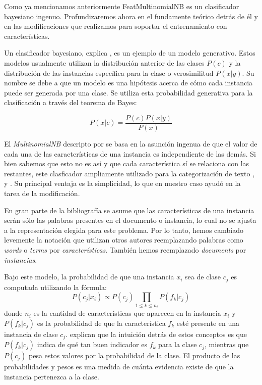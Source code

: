 Como ya mencionamos anteriormente FeatMultinomialNB es un clasificador bayesiano ingenuo. Profundizaremos ahora en el fundamente teórico detrás de él y en las modificaciones que realizamos para soportar el entrenamiento con características.

Un clasificador bayesiano, explica \citet{libro-abney}, es un ejemplo de un modelo generativo. Estos modelos usualmente utilizan la distribución anterior de las clases $P(c)$ y la distribución de las instancias específica para la clase o verosimilitud $P(x|y)$. Su nombre se debe a que un modelo es una hipótesis acerca de cómo cada instancia puede ser generada por una clase. Se utiliza esta probabilidad generativa para la clasificación a través del teorema de Bayes:

$$P(x|c) = \frac{P(c)P(x|y)}{P(x)}$$

El \textit{MultinomialNB} descripto por \citet{multinomial-manning} se basa en la asunción ingenua de que el valor de cada una de las características de una instancia es independiente de las demás. Si bien sabemos que esto no es así y que cada característica sí se relaciona con las restantes, este clasficador ampliamente utilizado para la categorización de texto \citet{dualist}, \citet{multinomialnb-comparision-mccallum} y \citet{multinomialnb-unbalanced}. Su principal ventaja es la simplicidad, lo que en nuestro caso ayudó en la tarea de la modificación.

En gran parte de la bibliografía se asume que las características de una instancia serán sólo las palabras presentes en el documento o instancia, lo cual no se ajusta a la representación elegida para este problema. Por lo tanto, hemos cambiado levemente la notación que utilizan otros autores reemplazando palabras como \textit{words} o \textit{terms} por \textit{características}. También hemos reemplazado \textit{documents} por \textit{instancias}.

Bajo este modelo, la probabilidad de que una instancia $x_i$ sea de clase $c_j$ es computada utilizando la fórmula:
\begin{equation}\label{eq-mnb-prob}
    P(c_j|x_i) \propto P(c_j) \prod_{1\leq k \leq n_i}P(f_k|c_j)
\end{equation}
donde $n_i$ es la cantidad de características que aparecen en la instancia $x_i$ y $P(f_k|c_j)$ es la probabilidad de que la característica $f_k$ esté presente en una instancia de clase $c_j$. \citet{multinomial-manning} explican que la intuición detrás de estos conceptos es que $P(f_k|c_j)$ indica de qué tan buen indicador es $f_k$ para la clase $c_j$, mientras que $P(c_j)$ pesa estos valores por la probabilidad de la clase. El producto de las probabilidades y pesos es una medida de cuánta evidencia existe de que la instancia pertenezca a la clase.


